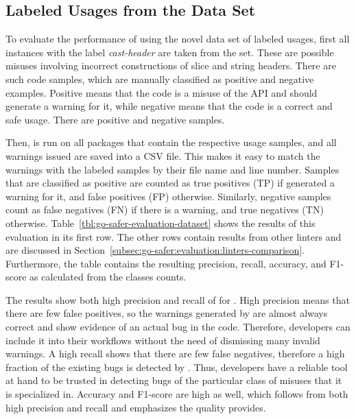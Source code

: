 
\subsection{Labeled Usages from the Data Set}\label{subsec:go-safer:evaluation:labeled-usages}

To evaluate the performance of \toolSafer{} using the novel data set of labeled \unsafe{} usages, first all instances
with the label \textit{cast-header} are taken from the set.
These are possible misuses involving incorrect constructions of slice and string headers.
There are  such code samples, which are manually classified as positive and negative examples.
Positive means that the code is a misuse of the \unsafe{} \acrshort{API} and \toolSafer{} should generate a warning for
it, while negative means that the code is a correct and safe usage.
There are  positive and  negative samples.

Then, \toolSafer{} is run on all packages that contain the respective  \unsafe{} usage samples, and all
warnings issued are saved into a \acrshort{CSV} file.
This makes it easy to match the warnings with the labeled samples by their file name and line number.
Samples that are classified as positive are counted as true positives (TP) if \toolSafer{} generated a warning for it,
and false positives (FP) otherwise.
Similarly, negative samples count as false negatives (FN) if there is a warning, and true negatives (TN) otherwise.
Table~\ref{tbl:go-safer-evaluation-dataset} shows the results of this evaluation in its first row.
The other rows contain results from other linters and are discussed in
Section~\ref{subsec:go-safer:evaluation:linters-comparison}.
Furthermore, the table contains the resulting precision, recall, accuracy, and F1-score as calculated from the classes
counts.



The results show both high precision and recall of  for \toolSafer{}.
High precision means that there are few false positives, so the warnings generated by \toolSafer{} are almost always
correct and show evidence of an actual bug in the code.
Therefore, developers can include it into their workflows without the need of dismissing many invalid warnings.
A high recall shows that there are few false negatives, therefore a high fraction of the existing bugs is detected by
\toolSafer{}.
Thus, developers have a reliable tool at hand to be trusted in detecting bugs of the particular class of \unsafe{}
misuses that it is specialized in.
Accuracy and F1-score are high as well, which follows from both high precision and recall and emphasizes the quality
\toolSafer{} provides.

